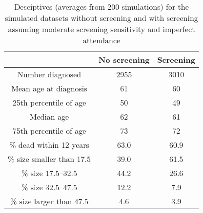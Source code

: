 \begin{table}
\centering
\caption{Desciptives (averages  from  200  simulations) for the simulated datasets without screening and with screening assuming moderate screening sensitivity and imperfect attendance}
\label{tab:des}
\begin{threeparttable}
\scalebox{1} {
\begin{tabular}{ccc}
\toprule
& No screening & Screening    \\
\midrule
Number diagnosed &  2955 & 3010  \\
Mean age at diagnosis &  61 & 60  \\
25th percentile of age &  50 & 49  \\
Median age &  62 & 61  \\
75th percentile of age &  73 & 72  \\
\% dead within 12 years &  63.0 & 60.9  \\
\% size smaller than 17.5 &  39.0 & 61.5 \\
\% size 17.5--32.5 &  44.2 & 26.6 \\
\% size 32.5--47.5 &  12.2 & 7.9 \\
\% size larger than 47.5 &  4.6 & 3.9 \\
\bottomrule
\end{tabular}}
\end{threeparttable}
\end{table}